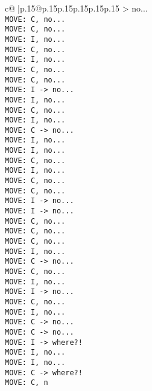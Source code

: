 \documentclass{article}
\begin{document}
{\begin{supertabular}{c@{$\;$}|p{.15\linewidth}@{}p{.15\linewidth}p{.15\linewidth}p{.15\linewidth}p{.15\linewidth}p{.15\linewidth}}
{{{> no...\\ \tt  MOVE: C, no...\\ \tt  MOVE: C, no...\\ \tt  MOVE: I, no...\\ \tt  MOVE: C, no...\\ \tt  MOVE: I, no...\\ \tt  MOVE: C, no...\\ \tt  MOVE: C, no...\\ \tt  MOVE: I -> no...\\ \tt  MOVE: I, no...\\ \tt  MOVE: C, no...\\ \tt  MOVE: I, no...\\ \tt  MOVE: C -> no...\\ \tt  MOVE: I, no...\\ \tt  MOVE: I, no...\\ \tt  MOVE: C, no...\\ \tt  MOVE: I, no...\\ \tt  MOVE: C, no...\\ \tt  MOVE: C, no...\\ \tt  MOVE: I -> no...\\ \tt  MOVE: I -> no...\\ \tt  MOVE: C, no...\\ \tt  MOVE: C, no...\\ \tt  MOVE: C, no...\\ \tt  MOVE: I, no...\\ \tt  MOVE: C -> no...\\ \tt  MOVE: C, no...\\ \tt  MOVE: I, no...\\ \tt  MOVE: I -> no...\\ \tt  MOVE: C, no...\\ \tt  MOVE: I, no...\\ \tt  MOVE: C -> no...\\ \tt  MOVE: C -> no...\\ \tt  MOVE: I -> where?!\\ \tt  MOVE: I, no...\\ \tt  MOVE: I, no...\\ \tt  MOVE: C -> where?!\\ \tt  MOVE: C, n}}}
\end{supertabular}}
\end{document}
